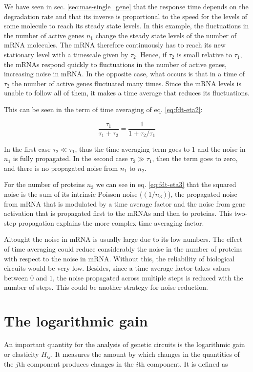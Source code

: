  We have seen in sec. \ref{sec:mas-single_gene} that the response time depends on the degradation rate and that its inverse is proportional to the speed for the levels of some molecule to reach its steady state levels. In this example, the fluctuations in the number of active genes $n_1$ change the steady state levels of the number of mRNA molecules. The mRNA therefore continuously has to reach its new stationary level with a timescale given by $\tau_2$. Hence, if $\tau_2$ is small relative to $\tau_1$, the mRNAs respond quickly to fluctuations in the number of active genes, increasing noise in mRNA. In the opposite case, what occurs is that in a time of $\tau_2$ the number of active genes fluctuated many times. Since the mRNA levels is unable to follow all of them, it makes a time average that reduces its fluctuations.

This can be seen in the term of time averaging of eq. \eqref{eq:fdt-eta2}:

\begin{equation*}
  \frac{\tau_1}{\tau_1+\tau_2} = \frac{1}{1+\tau_2/\tau_1}
\end{equation*}

In the first case $\tau_2\ll\tau_1$, thus the time averaging term goes to $1$ and the noise in $n_1$ is fully propagated. In the second case $\tau_2\gg\tau_1$, then the term goes to zero, and there is no propagated noise from $n_1$ to $n_2$.


For the number of proteins $n_3$ we can see in eq. \eqref{eq:fdt-eta3} that the squared noise is the sum of its intrinsic Poisson noise ($(1/n_3)$), the propagated noise from mRNA that is modulated by a time average factor and the noise from gene activation that is propagated first to the mRNAs and then to proteins. This two-step propagation explains the more complex time averaging factor.

Altought the noise in mRNA is usually large due to its low numbers. The effect of time averaging could reduce considerably the noise in the number of proteins with respect to the noise in mRNA. Without this, the reliability of biological circuits would be very low. Besides, since a time average factor takes values between $0$ and $1$, the noise propagated across multiple steps is reduced with the number of steps. This could be another strategy for noise reduction.

\section{The logarithmic gain}
\label{sec:log_gain}
An important quantity for the analysis of genetic circuits is the logarithmic gain or elasticity $H_{ij}$. It measures the amount by which changes in the quantities of the $j$th component produces changes in the $i$th component. It is defined as

